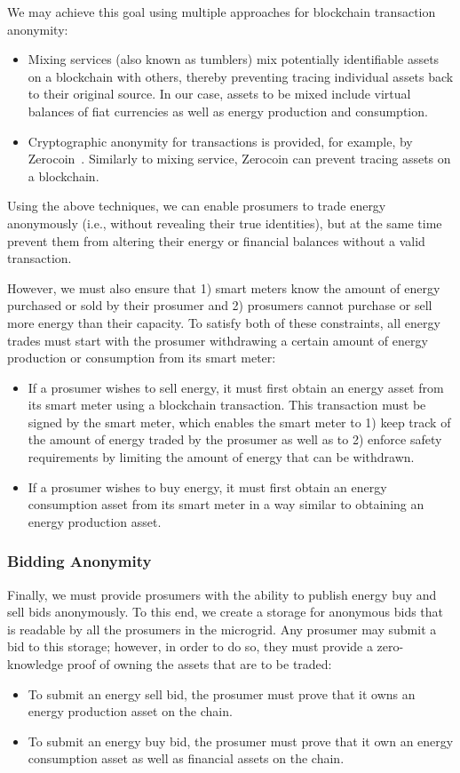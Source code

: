 We may achieve this goal using multiple approaches for blockchain transaction anonymity:
\begin{itemize}
\item Mixing services (also known as tumblers) mix potentially identifiable assets on a blockchain with others, thereby preventing tracing individual assets back to their original source. 
In our case, assets to be mixed include virtual balances of fiat currencies as well as energy production and consumption.
\item Cryptographic anonymity for transactions is provided, for example, by Zerocoin~\cite{miers2013zerocoin}. Similarly to mixing service, Zerocoin can prevent tracing assets on a blockchain.
\end{itemize}
Using the above techniques, we can enable prosumers to trade energy anonymously (i.e., without revealing their true identities), but at the same time prevent them from altering their energy or financial balances without a valid transaction.

However, we must also ensure that 1) smart meters know the amount of energy purchased or sold by their prosumer and 2) prosumers cannot purchase or sell more energy than their capacity.
To satisfy both of these constraints, all energy trades must start with the prosumer withdrawing a certain amount of energy production or consumption from its smart meter:
\begin{itemize}
\item If a prosumer wishes to sell energy, it must first obtain an energy asset from its smart meter using a blockchain transaction.
This transaction must be signed by the smart meter, which enables the smart meter to 1) keep track of the amount of energy traded by the prosumer as well as to 2) enforce safety requirements by limiting the amount of energy that can be withdrawn.
\item If a prosumer wishes to buy energy, it must first obtain an energy consumption asset from its smart meter in a way similar to obtaining an energy production asset.
\end{itemize}

\subsubsection{Bidding Anonymity}
Finally, we must provide prosumers with the ability to publish energy buy and sell bids anonymously.
To this end, we create a storage for anonymous bids that is readable by all the prosumers in the microgrid.
Any prosumer may submit a bid to this storage; however, in order to do so, they must provide a zero-knowledge proof of owning the assets that are to be traded:
\begin{itemize}
\item To submit an energy sell bid, the prosumer must prove that it owns an energy production asset on the chain.
\item To submit an energy buy bid, the prosumer must prove that it own an energy consumption asset as well as financial assets on the chain.
\end{itemize}


